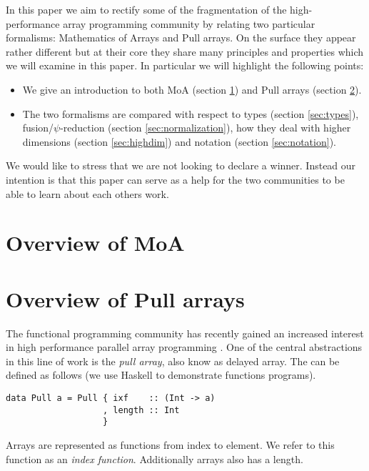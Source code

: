 \documentclass{sigplanconf}
\begin{document}
In this paper we aim to rectify some of the fragmentation of the
high-performance array programming community by relating two
particular formalisms: Mathematics of Arrays and Pull arrays. On the
surface they appear rather different but at their core they share many
principles and properties which we will examine in this paper. In
particular we will highlight the following points:
\begin{itemize}
\item We give an introduction to both MoA (section \ref{sec:moa}) and Pull
  arrays (section \ref{sec:pull}).
\item The two formalisms are compared with respect to types (section
  \ref{sec:types}), fusion/\(\psi\)-reduction (section
  \ref{sec:normalization}), how they deal with higher dimensions
  (section \ref{sec:highdim}) and notation (section \ref{sec:notation}).
\end{itemize}

We would like to stress that we are not looking to declare a
winner. Instead our intention is that this paper can serve as a help
for the two communities to be able to learn about each others work.

\section{Overview of MoA}
\label{sec:moa}



\section{Overview of Pull arrays}
\label{sec:pull}

The functional programming community has recently gained an increased
interest in high performance parallel array programming
\cite{keller2010regular,Axelsson:2010:Feldspar,Mainland:2010:Nikola,Svensson:2011:Obsidian,Claessen:2012:Expressive,Ankner:2013:AnEDSL,lippmeier2011efficient}. One
of the central abstractions in this line of work is the \emph{pull
  array}, also know as delayed array. The can be defined as follows
(we use Haskell \cite{marlow2010haskell} to demonstrate functions
programs).

\begin{verbatim}
data Pull a = Pull { ixf    :: (Int -> a)
                   , length :: Int
                   }
\end{verbatim}

Arrays are represented as functions from index to element. We refer to
this function as an \emph{index function}. Additionally arrays also
has a length.
\end{document}
